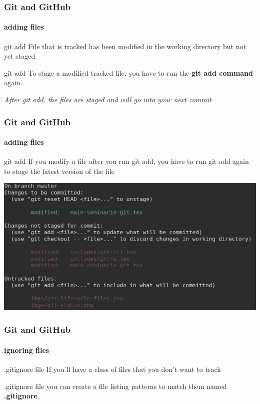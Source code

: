 \begin{frame}
	\frametitle{Git and GitHub}
    \framesubtitle{adding files}
    \addtocounter{nframe}{1}


	\begin{block}{git add}
		File that is tracked has been modified in the working directory but not yet staged
	\end{block}

	\begin{block}{git add}
		To stage a modified tracked file, you have to run the \textbf{git add command} again.
	\end{block}
	
	\textit{After git add, the files are staged and will go into your next commit}	

\end{frame}

\begin{frame}
	\frametitle{Git and GitHub}
    \framesubtitle{adding files}
    \addtocounter{nframe}{1}


	\begin{block}{git add}
		If you modify a file after you run git add, you have to run git add again to stage the latest version of the file
	\end{block}

	\begin{center}
		\includegraphics[width=.9\textwidth]{imgs/git-add-modify.png}
	\end{center}

\end{frame}

\begin{frame}
	\frametitle{Git and GitHub}
    \framesubtitle{ignoring files}
    \addtocounter{nframe}{1}


	\begin{block}{.gitignore file}
		If you’ll have a class of files that you don’t want to track
	\end{block}

	\begin{block}{.gitignore file}
		you can create a file listing patterns to match them named \textbf{.gitignore}.
	\end{block}

\end{frame}

